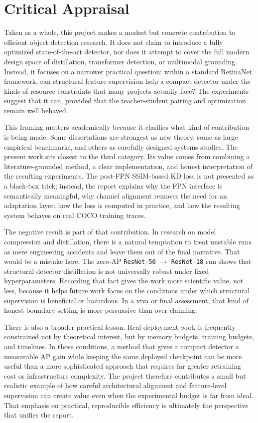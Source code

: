 \section{Critical Appraisal}

Taken as a whole, this project makes a modest but concrete contribution to efficient object detection research. It does not claim to introduce a fully optimized state-of-the-art detector, nor does it attempt to cover the full modern design space of distillation, transformer detection, or multimodal grounding. Instead, it focuses on a narrower practical question: within a standard RetinaNet framework, can structural feature supervision help a compact detector under the kinds of resource constraints that many projects actually face? The experiments suggest that it can, provided that the teacher-student pairing and optimization remain well behaved.

This framing matters academically because it clarifies what kind of contribution is being made. Some dissertations are strongest as new theory, some as large empirical benchmarks, and others as carefully designed systems studies. The present work sits closest to the third category. Its value comes from combining a literature-grounded method, a clear implementation, and honest interpretation of the resulting experiments. The post-FPN SSIM-based KD loss is not presented as a black-box trick; instead, the report explains why the FPN interface is semantically meaningful, why channel alignment removes the need for an adaptation layer, how the loss is computed in practice, and how the resulting system behaves on real COCO training traces.

The negative result is part of that contribution. In research on model compression and distillation, there is a natural temptation to treat unstable runs as mere engineering accidents and leave them out of the final narrative. That would be a mistake here. The zero-AP \texttt{ResNet-50} $\rightarrow$ \texttt{ResNet-18} run shows that structural detector distillation is not universally robust under fixed hyperparameters. Recording that fact gives the work more scientific value, not less, because it helps future work focus on the conditions under which structural supervision is beneficial or hazardous. In a viva or final assessment, that kind of honest boundary-setting is more persuasive than over-claiming.

There is also a broader practical lesson. Real deployment work is frequently constrained not by theoretical interest, but by memory budgets, training budgets, and timelines. In those conditions, a method that gives a compact detector a measurable AP gain while keeping the same deployed checkpoint can be more useful than a more sophisticated approach that requires far greater retraining cost or infrastructure complexity. The project therefore contributes a small but realistic example of how careful architectural alignment and feature-level supervision can create value even when the experimental budget is far from ideal. That emphasis on practical, reproducible efficiency is ultimately the perspective that unifies the report.

